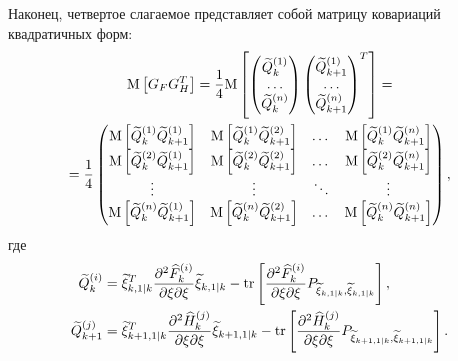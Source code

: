 Наконец, четвертое слагаемое представляет собой матрицу ковариаций квадратичных форм:
\begin{multline*}
    \mathrm{M} \left [ G_F G_H^T \right ]
        = \frac{1}{4}
            \mathrm{M} \left [ 
                \begin{pmatrix}
                    \widetilde{Q}_{k}^{(1)} \\
                    \dots \\
                    \widetilde{Q}_{k}^{(n)}
                \end{pmatrix}
                \begin{pmatrix}
                    \widetilde{Q}_{k+1}^{(1)} \\
                    \dots \\
                    \widetilde{Q}_{k+1}^{(n)}
                \end{pmatrix}^T
             \right ] = \\
    = \frac{1}{4}
        \begin{pmatrix}
            \mathrm{M} \left [ \widetilde{Q}_{k}^{(1)} \widetilde{Q}_{k+1}^{(1)} \right ] & \mathrm{M} \left [ \widetilde{Q}_{k}^{(1)} \widetilde{Q}_{k+1}^{(2)} \right ] & \dots  & \mathrm{M} \left [ \widetilde{Q}_{k}^{(1)} \widetilde{Q}_{k+1}^{(n)} \right ] \\
            \mathrm{M} \left [ \widetilde{Q}_{k}^{(2)} \widetilde{Q}_{k+1}^{(1)} \right ] & \mathrm{M} \left [ \widetilde{Q}_{k}^{(2)} \widetilde{Q}_{k+1}^{(2)} \right ] & \dots  & \mathrm{M} \left [ \widetilde{Q}_{k}^{(2)} \widetilde{Q}_{k+1}^{(n)} \right ] \\
            \vdots                                                          & \vdots                                                          & \ddots & \vdots \\
            \mathrm{M} \left [ \widetilde{Q}_{k}^{(n)} \widetilde{Q}_{k+1}^{(1)} \right ] & \mathrm{M} \left [ \widetilde{Q}_{k}^{(n)} \widetilde{Q}_{k+1}^{(2)} \right ] & \dots  & \mathrm{M} \left [ \widetilde{Q}_{k}^{(n)} \widetilde{Q}_{k+1}^{(n)} \right ]
        \end{pmatrix}
    ,
\end{multline*}
где
\begin{align*}
    \widetilde{Q}_{k}^{(i)} & = \widetilde{\xi}_{k,1|k}^T \frac{\partial^2 \widehat{F}_k^{(i)}}{{\partial \xi}{\partial \xi}} \widetilde{\xi}_{k,1|k} - \mathrm{tr} \left [ \frac{\partial^2 \widehat{F}_k^{(i)}}{{\partial \xi}{\partial \xi}} P_{\widetilde{\xi}_{k,1|k}, \widetilde{\xi}_{k,1|k}} \right ] , \\
    \widetilde{Q}_{k+1}^{(j)} & = \widetilde{\xi}_{k+1,1|k}^T \frac{\partial^2 \widehat{H}_k^{(j)}}{{\partial \xi}{\partial \xi}} \widetilde{\xi}_{k+1,1|k} - \mathrm{tr} \left [ \frac{\partial^2 \widehat{H}_k^{(j)}}{{\partial \xi}{\partial \xi}} P_{\widetilde{\xi}_{k+1,1|k}, \widetilde{\xi}_{k+1,1|k}} \right ] .
\end{align*}

